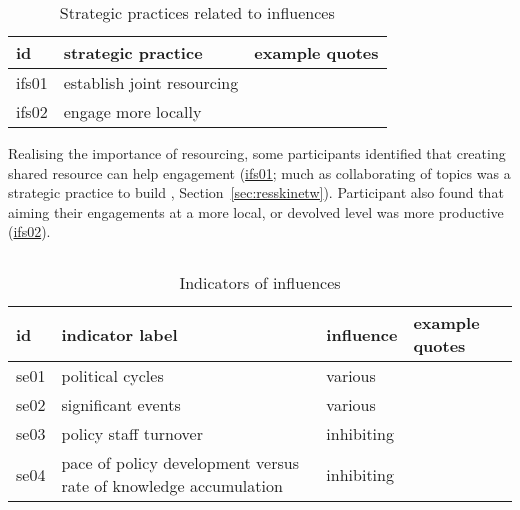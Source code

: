\begin{table}[!ht]
\footnotesize
\caption{Strategic practices related to \skiinfr{} influences}\label{tab:resskiinfrstrat}
\begin{tabular}{L{.06\linewidth}L{.3\linewidth}L{.64\linewidth}} \hline
\textbf{id} & \textbf{strategic practice} & \textbf{example quotes} \\ \hline \hline
ifs01 & establish joint resourcing &  \\[5mm]
ifs02 & engage more locally &  \\[5mm]
\hline
 \end{tabular}
\end{table}

Realising the importance of resourcing, some participants identified that creating shared resource can help engagement (\hyperref[tab:resskiinfrstrat]{ifs01}; much as collaborating of topics was a strategic practice to build \skinetw, Section~\ref{sec:resskinetw}). Participant also found that aiming their engagements at a more local, or devolved level was more productive (\hyperref[tab:resskiinfrstrat]{ifs02}).

\subsection{\titeven}\label{sec:resskieven}

\begin{table}[!ht]
\footnotesize
\caption{Indicators of \skieven{} influences}\label{tab:resskieven}
\begin{tabular}{L{.07\linewidth}L{.3\linewidth}L{.11\linewidth}L{.52\linewidth}} \hline
\textbf{id} & \textbf{indicator label} & \textbf{influence} & \textbf{example quotes} \\ \hline \hline 
se01 & political cycles & various &  \\[5mm]
se02 & significant events & various &  \\[5mm]
se03 & policy staff turnover & inhibiting &  \\[5mm]
se04 & pace of policy development versus rate of knowledge accumulation & inhibiting &  \\[5mm]
\hline
\end{tabular}
\end{table}


